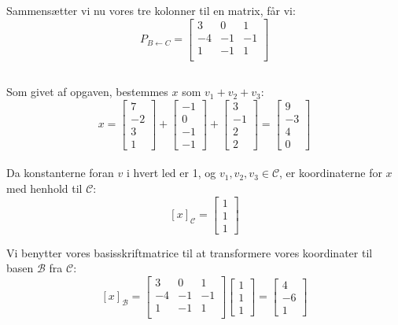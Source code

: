 \documentclass[a4paper,12pt]{article}
\begin{document}
Sammensætter vi nu vores tre kolonner til en matrix, får vi:\\
\[
P_{B\leftarrow C} = 
\left[\begin{array}{ccc}
    3 & 0 & 1\\
    -4 & -1 & -1\\
    1 & -1 & 1\\
\end{array}\right]
\]

\subsection{}
Som givet af opgaven, bestemmes $x$ som $v_1 + v_2 + v_3$:\\

\[
x = 
\left[\begin{array}{ccc}
    7\\
    -2\\
    3\\
    1
\end{array}\right]
+
\left[\begin{array}{ccc}
    -1\\
    0\\
    -1\\
    -1
\end{array}\right]
+
\left[\begin{array}{ccc}
    3\\
    -1\\
    2\\
    2
\end{array}\right]
=
\left[\begin{array}{ccc}
    9\\
    -3\\
    4\\
    0
\end{array}\right]
\]\\

Da konstanterne foran $v$ i hvert led er 1, og $v_1, v_2, v_3 \in \mathcal{C}$, er koordinaterne for $x$ med henhold til $\mathcal{C}$:
\[
[x]_\mathcal{C} = 
\left[\begin{array}{ccc}
    1\\
    1\\
    1
\end{array}\right]
\]

Vi benytter vores basisskriftmatrice til at transformere vores koordinater til basen $\mathcal{B}$ fra $\mathcal{C}$:
\[
[x]_\mathcal{B} = 
\left[\begin{array}{ccc}
    3 & 0 & 1\\
    -4 & -1 & -1\\
    1 & -1 & 1\\
\end{array}\right]
\left[\begin{array}{ccc}
    1\\
    1\\
    1
\end{array}\right]
=
\left[\begin{array}{ccc}
    4\\
    -6\\
    1
\end{array}\right]
\]
\end{document}
